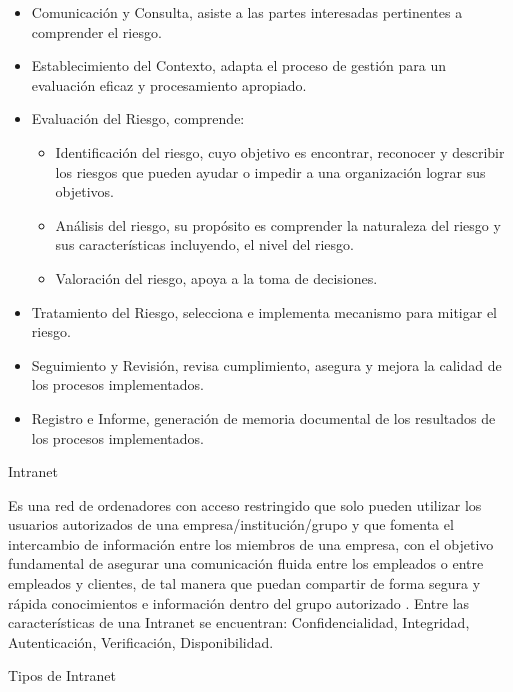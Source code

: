 \documentclass[a4paper,12pt]{article}
\begin{document}
\begin{itemize} 
\item Comunicación y Consulta, asiste a las partes interesadas pertinentes a comprender el 
riesgo. 
\item Establecimiento del Contexto, adapta el proceso de gestión para un evaluación 
eficaz y procesamiento apropiado. 
\item Evaluación del Riesgo, comprende:
\begin{itemize}
\item Identificación del riesgo, cuyo objetivo es encontrar, reconocer y describir los 
riesgos que pueden ayudar o impedir a una organización lograr sus objetivos. 
\item Análisis del riesgo, su propósito es comprender la naturaleza del riesgo y sus 
características incluyendo, el nivel del riesgo. 
\item Valoración del riesgo, apoya a la toma de decisiones.
\end{itemize} 
\item Tratamiento del Riesgo, selecciona e implementa mecanismo para mitigar el riesgo. 
\item Seguimiento y Revisión, revisa cumplimiento, asegura y mejora la calidad de los 
procesos implementados. 
\item Registro e Informe, generación de memoria documental de los resultados de los 
procesos implementados.\\
\end{itemize}
\begin{bf}
Intranet\\ 
\end{bf}
Es una red de ordenadores con acceso restringido que solo pueden utilizar los 
usuarios autorizados de una empresa/institución/grupo y que fomenta el intercambio
de información entre los miembros de una empresa, con el objetivo fundamental de 
asegurar una comunicación fluida entre los empleados o entre empleados y clientes, 
de tal manera que puedan compartir de forma segura y rápida conocimientos e 
información dentro del grupo autorizado \cite{Cabello2014}.
Entre las características de una Intranet se encuentran: Confidencialidad, 
Integridad, Autenticación, Verificación, Disponibilidad.\\
\newline
\begin{bf}
Tipos de Intranet\\
\end{bf}
\end{document}
